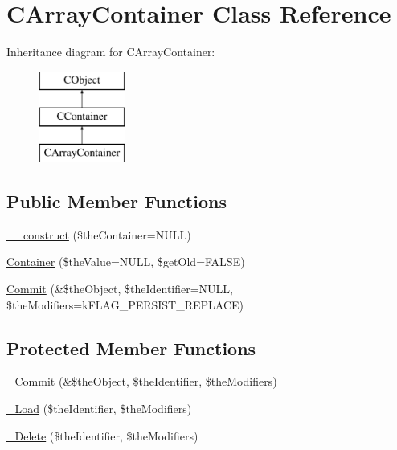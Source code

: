 \hypertarget{class_c_array_container}{\section{C\-Array\-Container Class Reference}
\label{class_c_array_container}
}
Inheritance diagram for C\-Array\-Container\-:\begin{figure}[H]
\begin{center}
\leavevmode
\includegraphics[height=3.000000cm]{class_c_array_container}
\end{center}
\end{figure}
\subsection*{Public Member Functions}
\begin{DoxyCompactItemize}
\item 
\hyperlink{class_c_array_container_a10e83176c2a2ee0d9fe53ca9e51b0ca0}{\-\_\-\-\_\-construct} (\$the\-Container=N\-U\-L\-L)
\item 
\hyperlink{class_c_array_container_ac63eeb55a8c374668c5c443fb6e27df3}{Container} (\$the\-Value=N\-U\-L\-L, \$get\-Old=F\-A\-L\-S\-E)
\item 
\hyperlink{class_c_array_container_ac89f1c53cc6680107cfb4703bd5103ca}{Commit} (\&\$the\-Object, \$the\-Identifier=N\-U\-L\-L, \$the\-Modifiers=k\-F\-L\-A\-G\-\_\-\-P\-E\-R\-S\-I\-S\-T\-\_\-\-R\-E\-P\-L\-A\-C\-E)
\end{DoxyCompactItemize}
\subsection*{Protected Member Functions}
\begin{DoxyCompactItemize}
\item 
\hyperlink{class_c_array_container_aed066fb29aae224fe77ce3d6e4540cac}{\-\_\-\-Commit} (\&\$the\-Object, \$the\-Identifier, \$the\-Modifiers)
\item 
\hyperlink{class_c_array_container_ac970cd81e09a1b87c6cad960de74856d}{\-\_\-\-Load} (\$the\-Identifier, \$the\-Modifiers)
\item 
\hyperlink{class_c_array_container_a7a6026166105a3d9281c3556836844bc}{\-\_\-\-Delete} (\$the\-Identifier, \$the\-Modifiers)
\end{DoxyCompactItemize}


